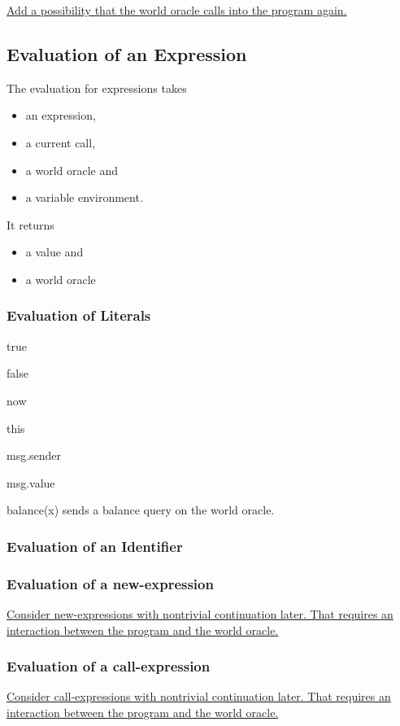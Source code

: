 \documentclass{book}
\newcommand{\todo}[1]{\underline{#1}}
\begin{document}
\todo{Add a possibility that the world oracle calls into the program again.}

\subsection{Evaluation of an Expression}

The evaluation for expressions takes
\begin{itemize}
\item an expression,
\item a current call,
\item a world oracle and
\item a variable environment.
\end{itemize}
It returns
\begin{itemize}
\item a value and
\item a world oracle
\end{itemize}

\subsubsection{Evaluation of Literals}

true

false

now

this

msg.sender

msg.value

balance(x) sends a balance query on the world oracle.

\subsubsection{Evaluation of an Identifier}

\subsubsection{Evaluation of a new-expression}

\todo{Consider new-expressions with nontrivial continuation later.  That requires an interaction between the program and the world oracle. }

\subsubsection{Evaluation of a call-expression}

\todo{Consider call-expressions with nontrivial continuation later.  That requires an interaction between the program and the world oracle. }
\end{document}
